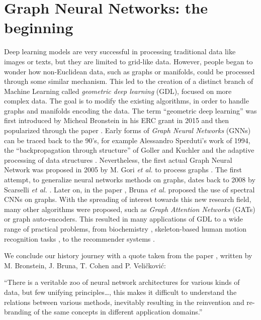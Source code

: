 \documentclass[12pt,a4paper]{report}
\theoremstyle{definition}
\begin{document}
\section{Graph Neural Networks: the beginning}
\label{sec:GNN}

Deep learning models are very successful in processing traditional data like images or texts, but they are limited to grid-like data. However, people began to wonder how non-Euclidean data, such as graphs or manifolds, could be processed through some similar mechanism. This led to the creation of a distinct branch of Machine Learning called \emph{geometric deep learning} (GDL), focused on more complex data. The goal is to modify the existing algorithms, in order to handle graphs and manifolds encoding the data. The term ``geometric deep learning'' was first introduced by Micheal Bronstein in his ERC grant in 2015 and then popularized through the paper \cite{Beyound_eucl_data}.
Early forms of \emph{Graph Neural Networks} (GNNs) can be traced back to the 90's, for example Alessandro Sperduti's work \cite{Sperduti_GNN} of 1994, the ``backpropagation through structure'' of Goller and Kuchler \cite{Goller_Kutchler} and the adaptive processing of data structures \cite{Frasconi_GNN}.
Nevertheless, the first actual Graph Neural Network was proposed in 2005 by M. Gori \textit{et al.} to process graphs \cite{Gori}. The first attempt, to generalize neural networks methods on graphs, dates back to 2008 by Scarselli \textit{et al.} \cite{Scarselli}. Later on, in the paper \cite{Bruna_GNN}, Bruna \textit{et al.} proposed the use of spectral CNNs on graphs.
With the spreading of interest towards this new research field, many other algorithms were proposed, such as \emph{Graph Attention Networks} (GATs) \cite{GATs} or graph auto-encoders. This resulted in many applications of GDL to a wide range of practical problems, from biochemistry \cite{BioChem}, skeleton-based human motion recognition tasks \cite{skeleton_motion}, to the recommender systems \cite{reccomender}.

We conclude our history journey with a quote taken from the paper \cite{5_Gs}, written by M. Bronstein, J. Bruna, T. Cohen and P. Veličković:

\begin{displayquote}
``There is a veritable zoo of neural network architectures for various kinds of data, but few unifying principles\ldots, this makes it difficult to understand the relations between various methods, inevitably resulting in the reinvention and re-branding of the same concepts in different application domains.''
\end{displayquote}
\end{document}
